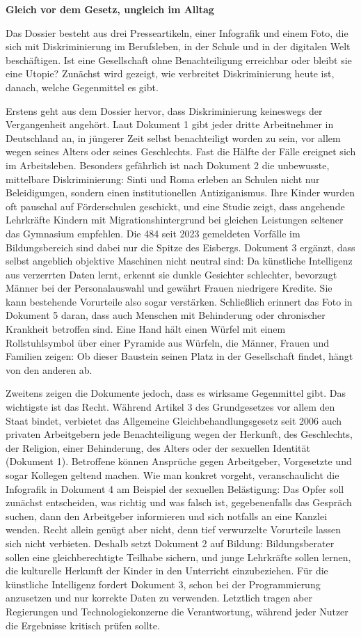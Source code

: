 \documentclass[11pt,a4paper]{article}
\begin{document}
\textbf{Gleich vor dem Gesetz, ungleich im Alltag}

Das Dossier besteht aus drei Presseartikeln, einer Infografik und einem Foto, die sich mit Diskriminierung im Berufsleben, in der Schule und in der digitalen Welt beschäftigen. Ist eine Gesellschaft ohne Benachteiligung erreichbar oder bleibt sie eine Utopie? Zunächst wird gezeigt, wie verbreitet Diskriminierung heute ist, danach, welche Gegenmittel es gibt.

Erstens geht aus dem Dossier hervor, dass Diskriminierung keineswegs der Vergangenheit angehört. Laut Dokument 1 gibt jeder dritte Arbeitnehmer in Deutschland an, in jüngerer Zeit selbst benachteiligt worden zu sein, vor allem wegen seines Alters oder seines Geschlechts. Fast die Hälfte der Fälle ereignet sich im Arbeitsleben. Besonders gefährlich ist nach Dokument 2 die unbewusste, mittelbare Diskriminierung: Sinti und Roma erleben an Schulen nicht nur Beleidigungen, sondern einen institutionellen Antiziganismus. Ihre Kinder wurden oft pauschal auf Förderschulen geschickt, und eine Studie zeigt, dass angehende Lehrkräfte Kindern mit Migrationshintergrund bei gleichen Leistungen seltener das Gymnasium empfehlen. Die 484 seit 2023 gemeldeten Vorfälle im Bildungsbereich sind dabei nur die Spitze des Eisbergs. Dokument 3 ergänzt, dass selbst angeblich objektive Maschinen nicht neutral sind: Da künstliche Intelligenz aus verzerrten Daten lernt, erkennt sie dunkle Gesichter schlechter, bevorzugt Männer bei der Personalauswahl und gewährt Frauen niedrigere Kredite. Sie kann bestehende Vorurteile also sogar verstärken. Schließlich erinnert das Foto in Dokument 5 daran, dass auch Menschen mit Behinderung oder chronischer Krankheit betroffen sind. Eine Hand hält einen Würfel mit einem Rollstuhlsymbol über einer Pyramide aus Würfeln, die Männer, Frauen und Familien zeigen: Ob dieser Baustein seinen Platz in der Gesellschaft findet, hängt von den anderen ab.

Zweitens zeigen die Dokumente jedoch, dass es wirksame Gegenmittel gibt. Das wichtigste ist das Recht. Während Artikel 3 des Grundgesetzes vor allem den Staat bindet, verbietet das Allgemeine Gleichbehandlungsgesetz seit 2006 auch privaten Arbeitgebern jede Benachteiligung wegen der Herkunft, des Geschlechts, der Religion, einer Behinderung, des Alters oder der sexuellen Identität (Dokument 1). Betroffene können Ansprüche gegen Arbeitgeber, Vorgesetzte und sogar Kollegen geltend machen. Wie man konkret vorgeht, veranschaulicht die Infografik in Dokument 4 am Beispiel der sexuellen Belästigung: Das Opfer soll zunächst entscheiden, was richtig und was falsch ist, gegebenenfalls das Gespräch suchen, dann den Arbeitgeber informieren und sich notfalls an eine Kanzlei wenden. Recht allein genügt aber nicht, denn tief verwurzelte Vorurteile lassen sich nicht verbieten. Deshalb setzt Dokument 2 auf Bildung: Bildungsberater sollen eine gleichberechtigte Teilhabe sichern, und junge Lehrkräfte sollen lernen, die kulturelle Herkunft der Kinder in den Unterricht einzubeziehen. Für die künstliche Intelligenz fordert Dokument 3, schon bei der Programmierung anzusetzen und nur korrekte Daten zu verwenden. Letztlich tragen aber Regierungen und Technologiekonzerne die Verantwortung, während jeder Nutzer die Ergebnisse kritisch prüfen sollte.
\end{document}
